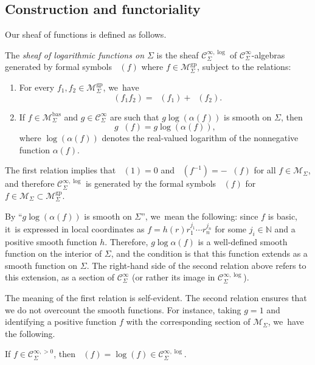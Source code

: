 \documentclass[10pt]{amsart}
\theoremstyle{definition}
\theoremstyle{remark}
\newenvironment{remark}
  {\pushQED{\qed}\renewcommand{\qedsymbol}{$\lozenge$}\remarkx}
  {\popQED\endremarkx}
\let\defn\emph
\newcommand{\NN}{\mathbb{N}}
\newcommand{\ulog}{\mathop{\widetilde{\log}}\nolimits}
\newcommand{\cM}{\mathscr{M}}
\newcommand{\cMgp}{\mathscr{M}^{\mathrm{gp}}}
\newcommand{\cMbas}{\mathscr{M}^{\mathrm{bas}}}
\newcommand{\Cinf}[1]{\mathscr{C}^{\infty}_{#1}}
\newcommand{\Cinfpos}[1]{\mathscr{C}^{\infty, > 0}_{#1}}
\newcommand{\Cinflog}[1]{\mathscr{C}^{\infty,\log}_{#1}}
\newcommand{\Sig}{\Sigma}
\begin{document}
\subsection{Construction and functoriality} Our sheaf of functions is defined as follows.
\begin{definition}\label{def:log-functions}
The \defn{sheaf of logarithmic functions on $\Sig$} is the sheaf $\Cinflog{\Sig}$ of $\Cinf{\Sig}$-algebras generated by formal symbols $\ulog(f)$ where $f \in \cMgp_\Sig$, subject to the relations:
\begin{enumerate}
\item For every $f_1,f_2 \in \cMgp_\Sig$, we~have
\[
\ulog(f_1f_2) = \ulog(f_1)+\ulog(f_2).
\]
\item If $f \in \cMbas_\Sig$ and $g \in \Cinf{\Sig}$ are such that $g\log(\alpha(f))$ is smooth on $\Sig$, then
\[
g\ulog(f) = g\log(\alpha(f)),
\]
where $\log(\alpha(f))$ denotes the real-valued logarithm of the nonnegative function $\alpha(f)$.
\end{enumerate}
\end{definition}

\begin{remark}
The first relation implies that $\ulog(1)=0$ and $\ulog(f^{-1})=-\ulog(f)$ for all $f\in\cM_\Sig$, and therefore $\Cinflog{\Sig}$ is generated by the formal symbols $\ulog(f)$ for $f\in \cM_\Sig\subset \cMgp_\Sig$.
\end{remark}

\begin{remark}
By ``$g\log(\alpha(f))$ is smooth on $\Sig$'', we~mean the following: since $f$ is basic, it~is expressed in local coordinates as $f=h(r)r_1^{j_1}\cdots r_n^{j_n}$ for some $j_i\in\NN$ and a positive smooth function $h$. Therefore, $g\log \alpha(f)$ is a well-defined smooth function on the interior of $\Sig$, and the condition is that this function extends as a smooth function on $\Sig$. The right-hand side of the second relation above refers to this extension, as a section of $\Cinf{\Sig}$ (or rather its image in $\Cinflog{\Sig}$).
\end{remark}

The meaning of the first relation is self-evident. The second relation ensures that we do not overcount the smooth functions. For instance, taking $g=1$ and identifying a positive function $f$ with the corresponding section of $\cM_\Sig$, we~have the following.

\begin{lemma}\label{lem:formal-vs-actual-log}
If $f \in \Cinfpos{\Sig}$, then $\ulog(f) = \log(f) \in \Cinflog{\Sig}$.
\end{lemma}
\end{document}
